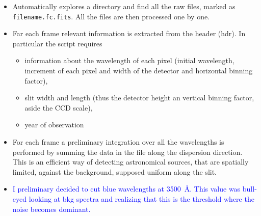 \documentclass{article}
\newcommand{\arbitrario}[1]{\textcolor{blue}{#1}}
\begin{document}
\begin{itemize}
	\item Automatically explores a directory and find all the raw files, marked as \texttt{filename.fc.fits}. All the files are then processed one by one.
	
	\item Far each frame relevant information is extracted from the header (hdr). In particular the script requires
	\begin{itemize}
		\item information about the wavelength of each pixel (initial wavelength, increment of each pixel and width of the detector and horizontal binning factor),
		\item slit width and length (thus the detector height an vertical binning factor, aside the CCD scale),
		\item year of observation
	\end{itemize}
	\item For each frame a preliminary integration over all the wavelengths is performed by summing the data in the file along the dispersion direction. This is an efficient way of detecting astronomical sources, that are spatially limited, against the background, supposed uniform along the slit.
	
	\item \arbitrario{I preliminary decided to cut blue wavelengths at \SI{3500}{\angstrom}. This value was bull-eyed looking at bkg spectra and realizing that this is the threshold where the noise becomes dominant.}
	

\end{itemize}
\end{document}
